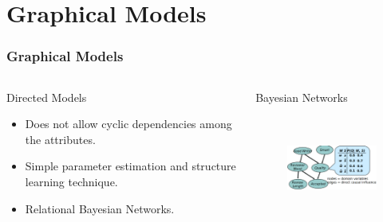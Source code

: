 \documentclass[10pt, blue,subsection=true, compress]{beamer}
\begin{document}
\section{Graphical Models}
\begin{frame} \frametitle{Graphical Models}
\begin{columns}[t]
\begin{flushleft}
\begin{block}{Directed Models}
\begin{itemize}
\item Does not allow cyclic dependencies among the attributes.
\item Simple parameter estimation and structure learning technique.
\item Relational Bayesian Networks. 
\end{itemize}
\end{block}
\end{flushleft}
\begin{flusright}
\begin{block}{Bayesian Networks}
\begin{figure}[!htbp]
\centering
\includegraphics[height=3.4cm,width=5cm,scale=0.18]{img/rbn.eps}
\end{figure}
\end{block}
\end{flusright}
\end{columns}
\end{frame} 
\end{document}
